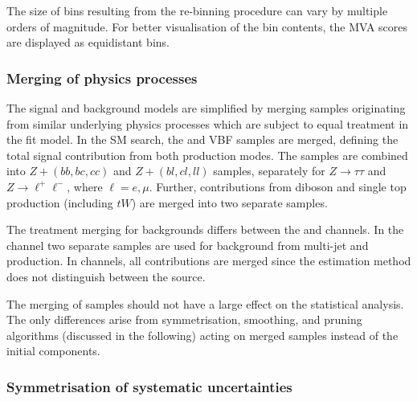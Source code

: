 The size of bins resulting from the re-binning procedure can vary by
multiple orders of magnitude. For better visualisation of the bin
contents, the MVA scores are displayed as equidistant bins.




\subsubsection{Merging of physics processes}

The signal and background models are simplified by merging samples
originating from similar underlying physics processes which are
subject to equal treatment in the fit model. In the SM \HH search, the
\ggF and VBF samples are merged, defining the total signal contribution
from both production modes. The \Zjets samples are combined into
$Z + (bb,bc,cc)$ and $Z + (bl,cl,ll)$ samples, separately for
$Z \to \tau\tau$ and $Z \to \ell^+\ell^-$, where $\ell = e,
\mu$. Further, contributions from diboson and single top production
(including $tW$) are merged into two separate samples.

The treatment merging for \faketauhadvis backgrounds differs between
the \hadhad and \lephad channels. In the \hadhad channel two separate
samples are used for \tauhadvis background from multi-jet and \ttbar
production. In \lephad channels, all \faketauhadvis contributions are
merged since the estimation method does not distinguish between the
\faketauhadvis source.

The merging of samples should not have a large effect on the
statistical analysis. The only differences arise from symmetrisation,
smoothing, and pruning algorithms (discussed in the following) acting
on merged samples instead of the initial components.


\subsubsection{Symmetrisation of systematic uncertainties}

